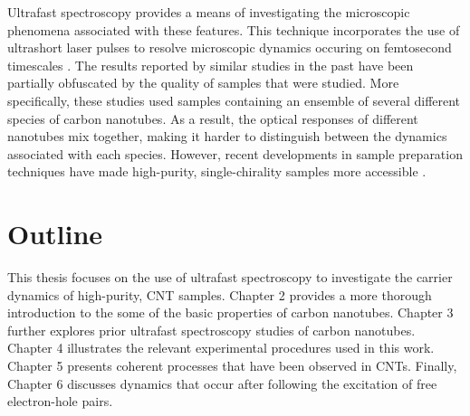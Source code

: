Ultrafast spectroscopy provides a means of investigating the microscopic phenomena associated with these features. This technique incorporates the use of ultrashort laser pulses to resolve microscopic dynamics occuring on femtosecond timescales \cite{shah1996ultrafast}. The results reported by similar studies in the past have been partially obfuscated by the quality of samples that were studied. More specifically, these studies used samples containing an ensemble of several different species of carbon nanotubes. As a result, the optical responses of different nanotubes mix together, making it harder to distinguish between the dynamics associated with each species. However, recent developments in sample preparation techniques have made high-purity, single-chirality samples more accessible \cite{ichinose2017extraction}.

\section{Outline}

This thesis focuses on the use of ultrafast spectroscopy to investigate the carrier dynamics of high-purity, CNT samples. Chapter 2 provides a more thorough introduction to the some of the basic properties of carbon nanotubes. Chapter 3 further explores prior ultrafast spectroscopy studies of carbon nanotubes. Chapter 4 illustrates the relevant experimental procedures used in this work. Chapter 5 presents coherent processes that have been observed in CNTs. Finally, Chapter 6 discusses dynamics that occur after following the excitation of free electron-hole pairs.
